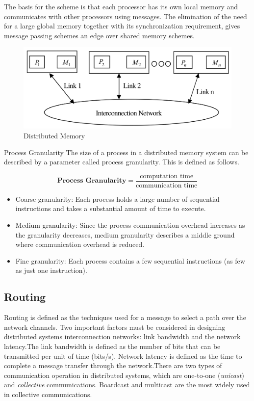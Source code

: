 \documentclass[11pt]{article}
\begin{document}
The basis for the scheme is that each processor has its own local memory and communicates with other processors using messages. The elimination of the need for a large global memory together with its synchronization requirement, gives message passing schemes an edge over shared memory schemes.

\begin{figure}[htp]
\centering
\includegraphics[scale=0.25]{distributed.png}
\caption{Distributed Memory}
\end{figure}

Process Granularity The size of a process in a distributed memory system can be described by a parameter called process granularity. This is defined as follows.

\begin{equation}
 \textbf{Process Granularity}= \frac{\text{computation time}}  {\text{communication time}}
\end{equation}

 
\begin{itemize}
  \item Coarse granularity: Each process holds a large number of sequential instructions and takes a substantial amount of time to execute.
  \item Medium granularity: Since the process communication overhead increases as the granularity decreases, medium granularity describes a middle ground
where communication overhead is reduced.
  \item Fine granularity: Each process contains a few sequential instructions (as few
as just one instruction).
\end{itemize}



\subsection{Routing}
Routing is defined as the techniques used for a message to select a path over the network channels.
Two important factors must be considered in designing distributed systems interconnection networks: link bandwidth and the network latency.The link bandwidth is defined as the number of bits that can be transmitted per unit of time (bits/s). Network latency is defined as the time to complete a message transfer through the network.There are two types of communication operation in distributed systems, which are one-to-one (\textit{unicast}) and \textit{collective} communications. Boardcast and multicast are the most widely used in collective communications.
\end{document}
